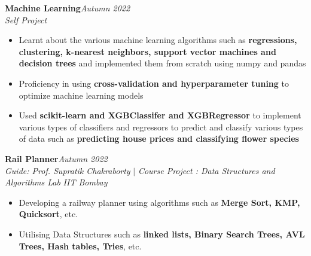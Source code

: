 \documentclass{article}
\begin{document}
\vspace{\baselineskip}
\vspace{-15pt}
\noindent\textbf{\large Machine Learning}\hfill{\sl \small Autumn 2022}\\
{\it Self Project}
\\\vspace{-17pt}
\begin{itemize}[itemsep = -1.4 mm, leftmargin=*]
    \item Learnt about the various machine learning algorithms such as \textbf{regressions, clustering, k-nearest neighbors, support vector machines and decision trees} and implemented them from scratch using numpy and pandas
    \item Proficiency in using \textbf{cross-validation and hyperparameter tuning} to optimize machine learning models
    \item Used \textbf{scikit-learn and XGBClassifer and XGBRegressor} to implement various types of classifiers and regressors to predict and classify various types of data such as \textbf{predicting house prices and classifying flower species}
\end{itemize}
\vspace{\baselineskip}
\vspace{-15pt}
\noindent\textbf{\large Rail Planner}\hfill{\sl \small Autumn 2022}\\
{\it Guide: Prof. Supratik Chakraborty} $|$ {\it Course Project : Data Structures and Algorithms Lab} \hfill{\it IIT Bombay}
\\\vspace{-17pt}
\begin{itemize}[itemsep = -1.4 mm, leftmargin=*]
    \item Developing a railway planner using algorithms such as \textbf{Merge Sort, KMP, Quicksort}, etc.
    \item Utilising Data Structures such as \textbf{linked lists, Binary Search Trees, AVL Trees, Hash tables, Tries}, etc.
\end{itemize}
\end{document}
